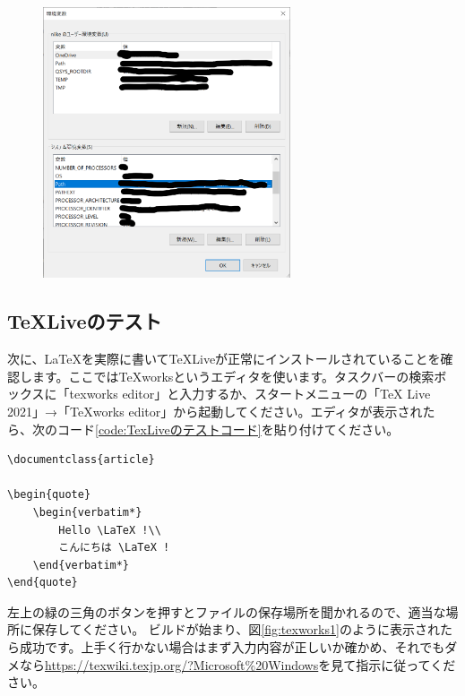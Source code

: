 \begin{figure}[H]
    \centering
    \includegraphics[height=80mm]{img/path3.png}
    \caption{}
    \label{fig:path3}
\end{figure}

\subsection{\TeX Liveのテスト}\label{textest}
次に、\LaTeX を実際に書いて\TeX Liveが正常にインストールされていることを確認します。ここではTeXworksというエディタを使います。タスクバーの検索ボックスに「texworks editor」と入力するか、スタートメニューの「TeX Live 2021」→「TeXworks editor」から起動してください。エディタが表示されたら、次のコード\ref{code:TexLiveのテストコード}を貼り付けてください。

\begin{lstlisting}[language={[LaTeX]TeX}, caption=TeXLiveのテストコード, label=code:TexLiveのテストコード]
\documentclass{article}

\begin{quote}
    \begin{verbatim*}
        Hello \LaTeX !\\
        こんにちは \LaTeX !
    \end{verbatim*}
\end{quote}

\end{lstlisting}

左上の緑の三角のボタンを押すとファイルの保存場所を聞かれるので、適当な場所に保存してください。 ビルドが始まり、図\ref{fig:texworks1}のように表示されたら成功です。上手く行かない場合はまず入力内容が正しいか確かめ、それでもダメなら\url{https://texwiki.texjp.org/?Microsoft%20Windows}を見て指示に従ってください。

